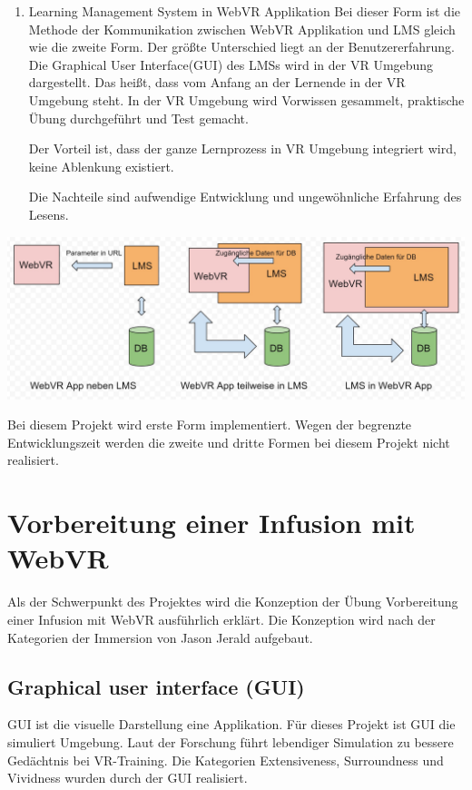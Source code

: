 \begin{enumerate}
   \item Learning Management System in WebVR Applikation
     \subitem Bei dieser Form ist die Methode der Kommunikation zwischen WebVR Applikation und LMS gleich wie die zweite Form. Der größte Unterschied liegt an der Benutzererfahrung. Die Graphical User Interface(GUI) des LMSs wird in der VR Umgebung dargestellt. Das heißt, dass vom Anfang an der Lernende in der VR Umgebung steht. In der VR Umgebung wird Vorwissen gesammelt, praktische Übung durchgeführt und Test gemacht.
     
     Der Vorteil ist, dass der ganze Lernprozess in VR Umgebung integriert wird, keine Ablenkung existiert.
     
     Die Nachteile sind aufwendige Entwicklung und ungewöhnliche Erfahrung des Lesens.
 \end{enumerate}
\includegraphics[width=\textwidth]{images/formenDerVerbindung.jpg}

Bei diesem Projekt wird erste Form implementiert. Wegen der begrenzte Entwicklungszeit werden die zweite und dritte Formen bei diesem Projekt nicht realisiert.

\section{Vorbereitung einer Infusion mit WebVR}

Als der Schwerpunkt des Projektes wird die Konzeption der Übung Vorbereitung einer Infusion mit WebVR ausführlich erklärt. Die Konzeption wird nach der Kategorien der Immersion von Jason Jerald\citep{28} aufgebaut.

 \subsection{Graphical user interface (GUI)}
 GUI ist die visuelle Darstellung eine Applikation. Für dieses Projekt ist GUI die simuliert Umgebung. Laut der Forschung führt lebendiger Simulation zu bessere Gedächtnis bei VR-Training. Die Kategorien Extensiveness, Surroundness und Vividness wurden durch der GUI realisiert.
 
